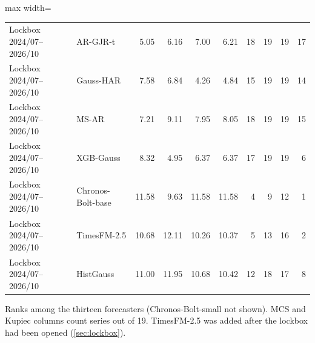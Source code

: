\begin{table}[!htbp]
\begin{adjustbox}{max width=\textwidth}
\begin{tabular}{llrrrrrrrr}
Lockbox 2024/07--2026/10 & AR-GJR-t & 5.05 & 6.16 & 7.00 & 6.21 & 18 & 19 & 19 & 17\\
Lockbox 2024/07--2026/10 & Gauss-HAR & 7.58 & 6.84 & 4.26 & 4.84 & 15 & 19 & 19 & 14\\
Lockbox 2024/07--2026/10 & MS-AR & 7.21 & 9.11 & 7.95 & 8.05 & 18 & 19 & 19 & 15\\
Lockbox 2024/07--2026/10 & XGB-Gauss & 8.32 & 4.95 & 6.37 & 6.37 & 17 & 19 & 19 & 6\\
Lockbox 2024/07--2026/10 & Chronos-Bolt-base & 11.58 & 9.63 & 11.58 & 11.58 & 4 & 9 & 12 & 1\\
Lockbox 2024/07--2026/10 & TimesFM-2.5 & 10.68 & 12.11 & 10.26 & 10.37 & 5 & 13 & 16 & 2\\
Lockbox 2024/07--2026/10 & HistGauss & 11.00 & 11.95 & 10.68 & 10.42 & 12 & 18 & 17 & 8\\
\bottomrule
\end{tabular}
\end{adjustbox}
\par\smallskip\begin{minipage}{\textwidth}\footnotesize
Ranks among the thirteen forecasters (Chronos-Bolt-small not shown). MCS and Kupiec columns count series out of 19. TimesFM-2.5 was added after the lockbox had been opened (\cref{sec:lockbox}).
\end{minipage}
\end{table}